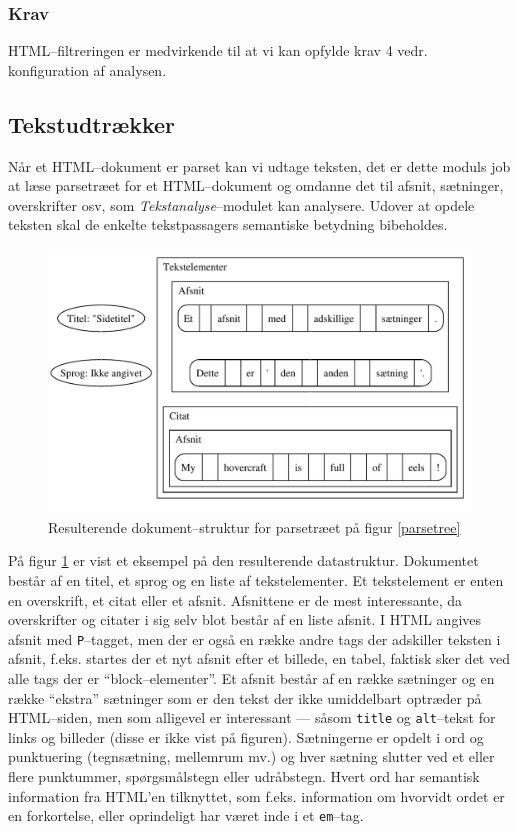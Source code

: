 \documentclass[a4paper,oneside]{memoir}
\begin{document}
\subsubsection{Krav}
HTML--filtreringen er medvirkende til at vi kan opfylde krav 4
vedr. konfiguration af analysen.

\subsection{Tekstudtrækker}
\label{tekstudtraekkerdesign}
Når et HTML--dokument er parset kan vi udtage teksten, det er dette
moduls job at læse parsetræet for et HTML--dokument og omdanne det til
afsnit, sætninger, overskrifter osv, som \textit{Tekstanalyse}--modulet
kan analysere. Udover at opdele teksten skal de enkelte tekstpassagers
semantiske betydning bibeholdes.

\begin{figure}
  \includegraphics[width=\textwidth]{documentill.pdf}
  \caption{Resulterende dokument--struktur for parsetræet på figur
    \ref{parsetree}}
  \label{dokument}
\end{figure}

På figur \ref{dokument} er vist et eksempel på den resulterende
datastruktur. Dokumentet består af en titel, et sprog og en liste af
tekstelementer. Et tekstelement er enten en overskrift, et citat eller
et afsnit. Afsnittene er de mest interessante, da overskrifter og
citater i sig selv blot består af en liste afsnit. I HTML angives
afsnit med \texttt{P}--tagget, men der er også en række andre tags der
adskiller teksten i afsnit, f.eks. startes der et nyt afsnit efter et
billede, en tabel, faktisk sker det ved alle tags der er
``block--elementer''. Et afsnit består af en række sætninger og en
række ``ekstra'' sætninger som er den tekst der ikke umiddelbart
optræder på HTML--siden, men som alligevel er interessant --- såsom
\texttt{title} og \texttt{alt}--tekst for links og billeder (disse er
ikke vist på figuren). Sætningerne er opdelt i ord og punktuering
(tegnsætning, mellemrum mv.) og hver sætning slutter ved et eller
flere punktummer, spørgsmålstegn eller udråbstegn. Hvert ord har
semantisk information fra HTML'en tilknyttet, som f.eks. information
om hvorvidt ordet er en forkortelse, eller oprindeligt har været inde
i et \texttt{em}--tag.
\end{document}
